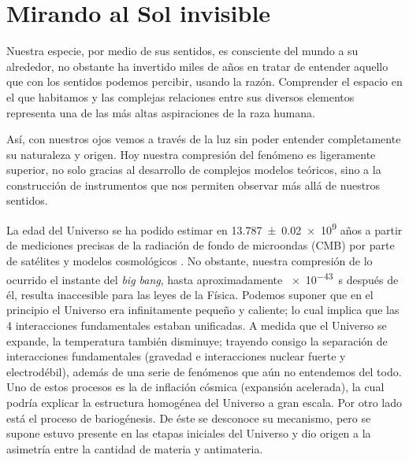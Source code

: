 
\chapter{Mirando al Sol invisible}
\label{chap:uno}

Nuestra especie, por medio de sus sentidos, es consciente del mundo a su alrededor, no obstante ha invertido miles de años en tratar de entender aquello que con los sentidos podemos percibir, usando la razón. Comprender el espacio en el que habitamos y las complejas relaciones entre sus diversos elementos representa una de las más altas aspiraciones de la raza humana.

Así, con nuestros ojos vemos a través de la luz sin poder entender completamente su naturaleza y origen. Hoy nuestra compresión del fenómeno es ligeramente superior, no solo gracias al desarrollo de complejos modelos teóricos, sino a la construcción de instrumentos que nos permiten observar más allá de nuestros sentidos.

La edad del Universo se ha podido estimar en \num{13.787(20)e9} años a partir de mediciones precisas de la radiación de fondo de microondas (CMB) por parte de satélites y modelos cosmológicos \cite{plank18}. No obstante, nuestra compresión de lo ocurrido el instante del \emph{big bang}, hasta aproximadamente \SI{e-43}{\second} después de él, resulta inaccesible para las leyes de la Física. Podemos suponer que en el principio el Universo era infinitamente pequeño y caliente; lo cual implica que las \num{4} interacciones fundamentales estaban unificadas. A medida que el Universo se expande, la temperatura también disminuye; trayendo consigo la separación de interacciones fundamentales (gravedad e interacciones nuclear fuerte y electrodébil), además de una serie de fenómenos que aún no entendemos del todo. Uno de estos procesos es la de inflación cósmica (expansión acelerada), la cual podría explicar la estructura homogénea del Universo a gran escala. Por otro lado está el proceso de bariogénesis. De éste se desconoce su mecanismo, pero se supone estuvo presente en las etapas iniciales del Universo y dio origen a la asimetría entre la cantidad de materia y antimateria.

